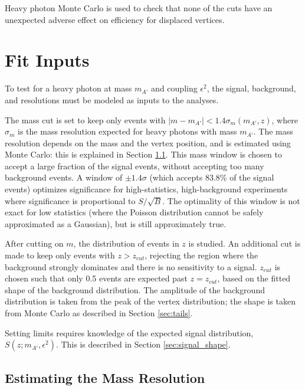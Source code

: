 Heavy photon Monte Carlo is used to check that none of the cuts have an unexpected adverse effect on efficiency for displaced vertices.

\clearpage
\section{Fit Inputs}


To test for a heavy photon at mass $m_{A'}$ and coupling $\epsilon^2$, the signal, background, and resolutions must be modeled as inputs to the analyses.

The mass cut is set to keep only events with $|m-m_{A'}|<1.4 \sigma_m(m_{A'},z)$, where $\sigma_m$ is the mass resolution expected for heavy photons with mass $m_{A'}$.
The mass resolution depends on the mass and the vertex position, and is estimated using Monte Carlo: this is explained in Section \ref{sec:mres}.
This mass window is chosen to accept a large fraction of the signal events, without accepting too many background events.
A window of $\pm1.4\sigma$ (which accepts 83.8\% of the signal events) optimizes significance for high-statistics, high-background experiments where significance is proportional to $S/\sqrt{B}$.
The optimality of this window is not exact for low statistics (where the Poisson distribution cannot be safely approximated as a Gaussian), but is still approximately true.

After cutting on $m$, the distribution of events in $z$ is studied.
An additional cut is made to keep only events with $z>z_{cut}$, rejecting the region where the background strongly dominates and there is no sensitivity to a signal.
$z_{cut}$ is chosen such that only 0.5 events are expected past $z=z_{cut}$, based on the fitted shape of the background distribution.
The amplitude of the background distribution is taken from the peak of the vertex distribution; the shape is taken from Monte Carlo as described in Section \ref{sec:tails}.

Setting limits requires knowledge of the expected signal distribution, $S(z;m_{A'},\epsilon^2)$.
This is described in Section \ref{sec:signal_shape}.

\clearpage
\subsection{Estimating the Mass Resolution}
\label{sec:mres}

